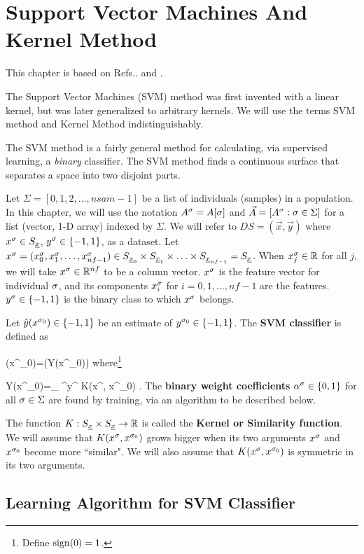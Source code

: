 \chapter{Support Vector Machines And Kernel Method}
\label{ch-svm}
This chapter is based on Refs.\cite{wiki-kernel-way}.
\cite{wiki-svm} and \cite{wiki-kernel-per}.

The Support Vector Machines (SVM) method
was first invented with a linear kernel, but
was later generalized to arbitrary kernels.
We will use the terms SVM method and Kernel Method
indistinguishably. 

The SVM method is a
fairly general method
for
calculating, via supervised learning, a
{\it binary} classifier.
The SVM method
finds a continuous surface
that separates a space into two 
disjoint parts.


Let $\Sigma=[0,1,2, \ldots, nsam-1]$ be a list of
individuals (samples) in a population.
In this chapter, we will use the notation 
$A^\sigma=A[\sigma]$ 
and $\vec{A}=[A^\sigma:\sigma\in \Sigma]$
for a  list (vector, 1-D  array) 
indexed by $\Sigma$.
We will refer to $DS=(\vec{x}, \vec{y})$ 
where $x^\sigma\in S_{\underline{x}}$,
 $y^\sigma\in \{-1, 1\}$,
as a dataset. Let
$x^\sigma=(x^\sigma_0, x^\sigma_1, 
\ldots, x^\sigma_{nf-1})
\in S_{{\underline{x}}_0}\times S_{{\underline{x}}_1}
\times\ldots\times
 S_{{\underline{x}}_{nf-1}}=S_{\underline{x}}$.
When $x^\sigma_j\in { \mathbb{R}}$ for all 
$j$,
we will take $x^\sigma\in { \mathbb{R}}^{nf}$ 
to be a column vector.
$x^\sigma$ is the feature vector for individual
$\sigma$, and its components $x^\sigma_i$
for $i=0,1,\ldots, nf-1$ are the features.
$y^\sigma\in \{-1, 1\}$ is the binary 
class to which $x^\sigma$ belongs.

Let ${\hat{y}}(x^{\sigma_0})\in\{-1, 1\}$ be an estimate of
$y^{\sigma_0}\in\{-1, 1\}$.
The {\bf SVM classifier} is defined as

\beq
\haty(x^{\s_0})=\sign(Y(x^{\s_0}))
\label{eq-svm-haty}
\eeq
where\footnote{Define ${\rm sign}(0)=1$.}

\beq
Y(x^{\s_0})=\sum_\s
\alp^\s y^\s 
K(x^\s, x^{\s_0})
\;.
\label{eq-yy-x-sig}
\eeq
The {\bf binary weight coefficients} $\alpha^\sigma\in \{0,1\}$
for all $\sigma\in\Sigma$ are found 
by training, via an algorithm
to be described below.

The function $K:S_{\underline{x}}\times S_{\underline{x}}
\rightarrow { \mathbb{R}}$
is called the {\bf Kernel 
or Similarity function}.
We will assume that
$K(x^\sigma, x^{\sigma_0})$ grows bigger
when its two arguments
$x^\sigma$ and $x^{\sigma_0}$ 
become more ``similar".
We will 
also assume that
$K(x^\sigma, x^{\sigma_0})$ is symmetric in its two arguments.

\section{Learning Algorithm for SVM Classifier}



